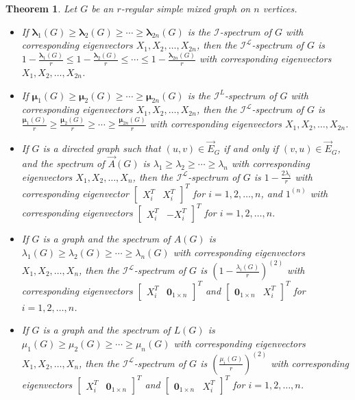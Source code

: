 \documentclass[12pt]{article}
\numberwithin{equation}{section}
\newtheorem{thm}{Theorem}[section]
\begin{document}
	\begin{thm}\label{thm-normalized regular}
		Let $G$ be an $r$-regular simple mixed graph on $n$ vertices.
		\begin{itemize}
			\item[(i)] If $\bm{\lambda}_1(G)\geq\bm{\lambda}_{2}(G)\geq\cdots\geq\bm{\lambda}_{2n}(G)$ is the $\mathcal{I}$-spectrum of $G$  with corresponding eigenvectors $X_1,X_2,\ldots,X_{2n}$, then the $\mathcal{I}^\mathcal{L}$-spectrum of $G$ is $1-\frac{\bm{\lambda}_1(G)}{r}\leq 1-\frac{\bm{\lambda}_2(G)}{r}\leq \cdots\leq 1-\frac{\bm{\lambda}_{2n}(G)}{r}$  with corresponding eigenvectors $X_1,X_2,\ldots,X_{2n}$.
			\item[(ii)] If $\bm{\mu}_1(G)\geq\bm{\mu}_{2}(G)\geq\cdots\geq\bm{\mu}_{2n}(G)$ is the $\mathcal{I}^L$-spectrum of $G$  with corresponding eigenvectors $X_1,X_2,\ldots,X_{2n}$, then the $\mathcal{I}^\mathcal{L}$-spectrum of $G$ is $\frac{\bm{\mu}_1(G)}{r}\geq \frac{\bm{\mu}_2(G)}{r}\geq \cdots\geq \frac{\bm{\mu}_{2n}(G)}{r}$  with corresponding eigenvectors $X_1,X_2,\ldots,X_{2n}$.
			\item[(iii)] If $G$ is a directed graph such that $(u,v)\in\vec{E}_G$ if and only if $(v,u)\in\vec{E}_G$, and the spectrum of $\vec{A}(G)$ is $\lambda_1\geq\lambda_{2}\geq\cdots\geq\lambda_n$ with corresponding eigenvectors $X_1,X_2,\ldots,X_n$, then the $\mathcal{I}^\mathcal{L}$-spectrum of $G$ is $1-\frac{2\lambda_i}{r}$  with corresponding eigenvector $\begin{bmatrix}
				X_i^T&
				X_i^T
			\end{bmatrix}^T$ for $i=1,2,\ldots,n$, and $1^{(n)}$ with corresponding eigenvectors $\begin{bmatrix}
				X_i^T&
				-X_i^T
			\end{bmatrix}^T$  for $i=1,2,\ldots,n$.
			
			\item[(iv)] If $G$ is a graph and the spectrum of $A(G)$ is $\lambda_1(G)\geq\lambda_{2}(G)\geq\cdots\geq\lambda_n(G)$ with corresponding eigenvectors $X_1,X_2,\ldots,X_n$, then the $\mathcal{I}^\mathcal{L}$-spectrum of $G$ is $(1-\frac{\lambda_i(G)}{r})^{(2)}$  with  corresponding eigenvectors $\begin{bmatrix}
				X_i^T&
				\mathbf{0}_{1\times n}
			\end{bmatrix}^T$ and $\begin{bmatrix}
				\mathbf{0}_{1\times n}&
				X_i^T
			\end{bmatrix}^T$ for $i=1,2,\ldots,n$.
			
			\item[(v)] If $G$ is a graph and the spectrum of $L(G)$ is $\mu_1(G)\geq\mu_{2}(G)\geq\cdots\geq\mu_n(G)$ with corresponding eigenvectors $X_1,X_2,\ldots,X_n$, then the $\mathcal{I}^\mathcal{L}$-spectrum of $G$ is $(\frac{\mu_i(G)}{r})^{(2)}$ with corresponding eigenvectors $\begin{bmatrix}
				X_i^T&
				\mathbf{0}_{1\times n}
			\end{bmatrix}^T$ and $\begin{bmatrix}
				\mathbf{0}_{1\times n}&
				X_i^T
			\end{bmatrix}^T$ for $i=1,2,\ldots,n$.
		\end{itemize}
	\end{thm}
\end{document}
